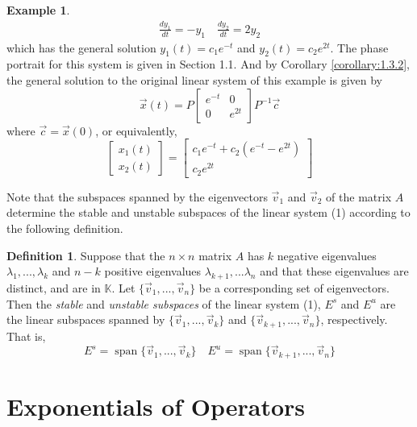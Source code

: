 \documentclass[11pt]{book}
\theoremstyle{definition}\newtheorem{definition}[subsection]{Definition}
\theoremstyle{definition}\newtheorem{example}[subsection]{Example}
\theoremstyle{definition}\newtheorem{notation}[subsection]{Notation}
\theoremstyle{definition}\newtheorem{remark}[subsection]{Remark}
\theoremstyle{theorem}\newtheorem{theorem}[subsection]{Theorem}
\theoremstyle{theorem}\newtheorem{lemma}[subsection]{Lemma}
\theoremstyle{theorem}\newtheorem{proposition}[subsection]{Proposition}
\theoremstyle{theorem}\newtheorem{corollary}[subsection]{Corollary}
\theoremstyle{theorem}\newtheorem{case}{Case}
\theoremstyle{remark}\newtheorem{subcase}{Subcase}[case]
\newcommand{\K}{\mathbb{K}}
\DeclareMathOperator{\Span}{span}
\begin{document}
\begin{example}
\begin{align*}
        \frac{dy_1}{dt} = -y_1 \quad \frac{dy_2}{dt} = 2y_2
    \end{align*}
    which has the general solution $y_1(t) = c_1e^{-t}$ and $y_2(t) = c_2e^{2t}$. The phase portrait for this system is given in Section 1.1. And by Corollary \ref{corollary:1.3.2}, the general solution to the original linear system of this example is given by
    \begin{equation*}
        \vec{x}(t) = P\begin{bmatrix} e^{-t} & 0 \\ 0 & e^{2t} \end{bmatrix} P^{-1} \vec{c}
    \end{equation*}
    where $\vec{c} = \vec{x}(0)$, or equivalently,
    \begin{equation*}
        \begin{bmatrix} x_1(t) \\ x_2(t) \end{bmatrix} = \begin{bmatrix} c_1e^{-t} + c_2(e^{-t} - e^{2t}) \\ c_2e^{2t} \end{bmatrix} \tag{3}
    \end{equation*}
\end{example}

Note that the subspaces spanned by the eigenvectors $\vec{v}_1$ and $\vec{v}_2$ of the matrix $A$ determine the stable and unstable subspaces of the linear system (1) according to the following definition.

\begin{definition}\label{definition:1.3.4}
    Suppose that the $n \times n$ matrix $A$ has $k$ negative eigenvalues $\lambda_1,..., \lambda_k$ and $n - k$ positive eigenvalues $\lambda_{k + 1},... \lambda_n$ and that these eigenvalues are distinct, and are in $\K$. Let $\{\vec{v}_1,..., \vec{v}_n\}$ be a corresponding set of eigenvectors. Then the \emph{stable} and \emph{unstable subspaces} of the linear system (1), $E^s$ and $E^u$ are the linear subspaces spanned by $\{\vec{v}_1,..., \vec{v}_k\}$ and $\{\vec{v}_{k + 1},..., \vec{v}_n\}$, respectively. That is,
    \begin{equation*}
        E^s = \Span\{\vec{v}_1,..., \vec{v}_k\} \quad E^u = \Span\{\vec{v}_{k + 1},..., \vec{v}_n\}
    \end{equation*}
\end{definition}

\section{Exponentials of Operators}
\end{document}
